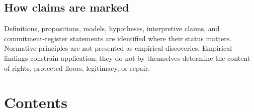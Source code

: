 \documentclass[
  11pt,
]{article}
\begin{document}
\subsection{How claims are marked}\label{how-claims-are-marked}

Definitions, propositions, models, hypotheses, interpretive claims, and
commitment-register statements are identified where their status
matters. Normative principles are not presented as empirical
discoveries. Empirical findings constrain application; they do not by
themselves determine the content of rights, protected floors,
legitimacy, or repair.

\section{Contents}\label{contents}
\end{document}
